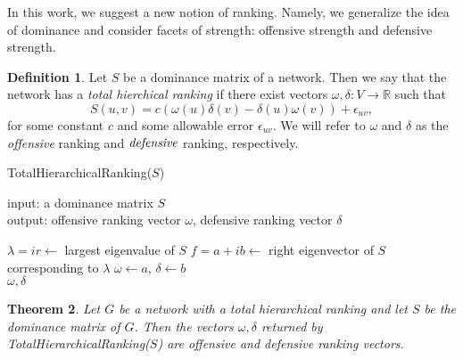 \documentclass[a4,11pt,twoside,leqno]{report}
\newtheorem{thm}{Theorem}[section]
\theoremstyle{definition}
\newtheorem{defn}[thm]{Definition}
\theoremstyle{remark}
\numberwithin{equation}{section}
\newcommand{\R}{\mathbb{R}}
\begin{document}
In this work, we suggest a new notion of ranking.  Namely, we generalize the
idea of dominance and consider facets of strength: offensive strength and
defensive strength.

\begin{defn}
Let $S$ be a dominance matrix of a network.  Then we say that the network has a
\emph{total hierchical ranking} if there exist vectors $\omega, \delta: V
\rightarrow \R$ such that
\begin{equation}\label{eq:offdef}
S(u,v) = c(\omega(u)\delta(v) - \delta(u)\omega(v)) + \epsilon_{uv},
\end{equation}
for some constant $c$ and some allowable error $\epsilon_{uv}$.  We will refer
to $\omega$ and $\delta$ as the \emph{offensive} ranking and $\emph{defensive}$
ranking, respectively.
\end{defn}

\begin{algorithm}[H]
\caption{TotalHierarchicalRanking($S$)}
\label{alg:thr}
input: a dominance matrix $S$\\
output: offensive ranking vector $\omega$, defensive ranking vector $\delta$\\
\begin{algorithmic}
  \State $\lambda=ir \gets$ largest eigenvalue of $S$
  \State $f=a+ib \gets$ right eigenvector of $S$ corresponding to $\lambda$
  \State $\omega \gets a$, $\delta \gets b$\\
  \Return $\omega, \delta$
\end{algorithmic} 
\end{algorithm}

\begin{thm}\label{thm:thr}
Let $G$ be a network with a total hierarchical ranking and let $S$ be the
dominance matrix of $G$.  Then the vectors $\omega, \delta$ returned by
TotalHierarchicalRanking($S$) are offensive and defensive ranking vectors.
\end{thm}
\end{document}
